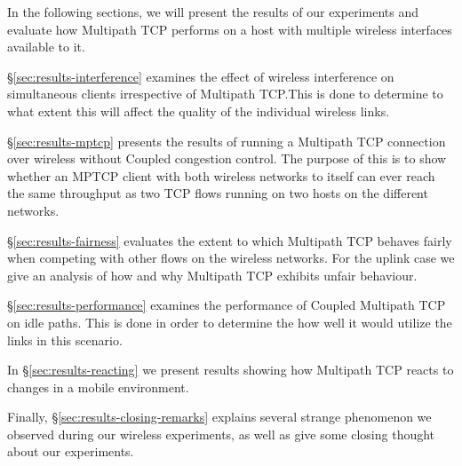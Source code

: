 In the following sections, we will present the results of our experiments and
evaluate how Multipath TCP performs on a host with multiple wireless
interfaces available to it.

\S\ref{sec:results-interference} examines the effect of wireless
interference on simultaneous clients irrespective of Multipath TCP.\@ This is
done to determine to what extent this will affect the quality of the individual
wireless links.

\S\ref{sec:results-mptcp} presents the results of running a Multipath TCP
connection over wireless without Coupled congestion control. The purpose of this
is to show whether an MPTCP client with both wireless networks to itself can
ever reach the same throughput as two TCP flows running on two hosts on
the different networks.

\S\ref{sec:results-fairness} evaluates the extent to which Multipath TCP behaves
fairly when competing with other flows on the wireless networks. For the uplink
case we give an analysis of how and why Multipath TCP exhibits unfair behaviour.

\S\ref{sec:results-performance} examines the performance of Coupled Multipath 
TCP on idle paths. This is done in order to determine the how well it would 
utilize the links in this scenario.

In \S\ref{sec:results-reacting} we present results showing how Multipath TCP 
reacts to changes in a mobile environment.

Finally, \S\ref{sec:results-closing-remarks} explains several strange phenomenon
we observed during our wireless experiments, as well as give some closing
thought about our experiments.
